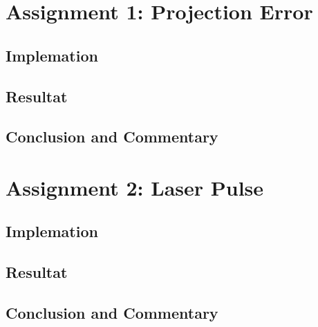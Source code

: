 \documentclass[12pt]{article}
\begin{document}
\section{Assignment 1: Projection Error}

\subsection{Implemation}



\subsection{Resultat}

\subsection{Conclusion and Commentary}

\section{Assignment 2: Laser Pulse}

\subsection{Implemation}



\subsection{Resultat}

\subsection{Conclusion and Commentary}
\end{document}
